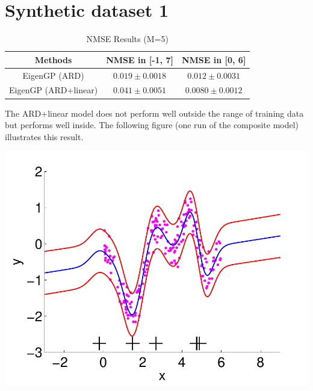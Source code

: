 \documentclass[]{article}
\title{}
\author{}
\begin{document}

\section{Synthetic dataset 1}
\begin{table}[h]
\caption{NMSE Results (M=5)} \label{table:basisfunction}
\vspace{-.0in}
\begin{center}
\begin{tabular}{|c|c|c|}
\hline
Methods & NMSE in [-1, 7]& NMSE in [0, 6] \\
\hline 
\hline
EigenGP (ARD) &  $ 0.019 \pm 0.0018$ & $0.012\pm0.0031$\\
\hline
EigenGP (ARD+linear)& $0.041\pm0.0051$  & $0.0080\pm0.0012$\\
\hline 
\end{tabular}
\end{center}
\vspace{-.0in}
\end{table}
The ARD+linear model does not perform well outside the range of training data but performs 
well inside. The following figure (one run of the composite model) illustrates this result.

\includegraphics[scale=0.8]{../syn1/fig/syn_EigenGP_kerB_ns_M5_10.pdf}
\newpage
\end{document}
